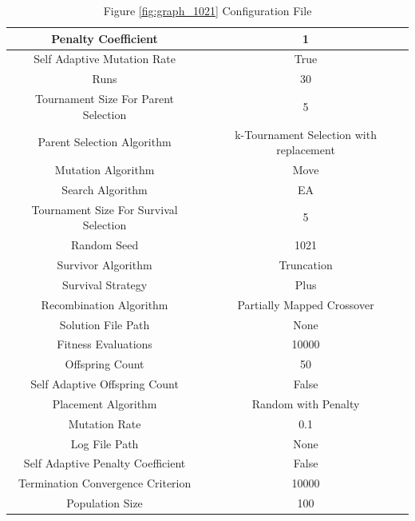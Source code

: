 \documentclass{standalone}
\begin{document}
\begin{table}[!htb]
	\centering
	\caption{Figure \ref{fig:graph_1021} Configuration File}
	\label{tab:graph_1021}
	\begin{tabular}{| c | c |}
		\hline
		Penalty Coefficient		& 1		 \\
		\hline
		Self Adaptive Mutation Rate		& True		 \\
		\hline
		Runs		& 30		 \\
		\hline
		Tournament Size For Parent Selection		& 5		 \\
		\hline
		Parent Selection Algorithm		& k-Tournament Selection with replacement		 \\
		\hline
		Mutation Algorithm		& Move		 \\
		\hline
		Search Algorithm		& EA		 \\
		\hline
		Tournament Size For Survival Selection		& 5		 \\
		\hline
		Random Seed		& 1021		 \\
		\hline
		Survivor Algorithm		& Truncation		 \\
		\hline
		Survival Strategy		& Plus		 \\
		\hline
		Recombination Algorithm		& Partially Mapped Crossover		 \\
		\hline
		Solution File Path		& None		 \\
		\hline
		Fitness Evaluations		& 10000		 \\
		\hline
		Offspring Count		& 50		 \\
		\hline
		Self Adaptive Offspring Count		& False		 \\
		\hline
		Placement Algorithm		& Random with Penalty		 \\
		\hline
		Mutation Rate		& 0.1		 \\
		\hline
		Log File Path		& None		 \\
		\hline
		Self Adaptive Penalty Coefficient		& False		 \\
		\hline
		Termination Convergence Criterion		& 10000		 \\
		\hline
		Population Size		& 100		 \\
		\hline
	\end{tabular}
\end{table}
\end{document}
